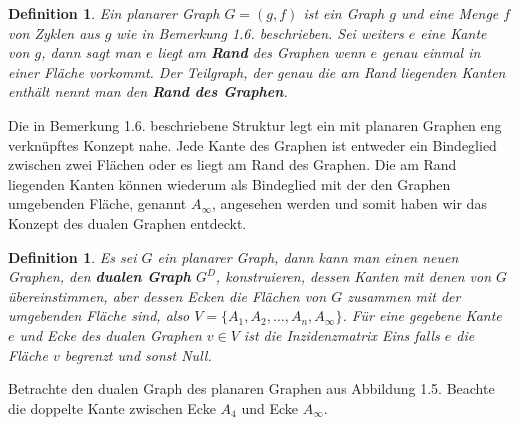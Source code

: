 \documentclass[11pt,a4paper,leqno]{report}
\newtheorem{definition}[theorem]{Definition}
\numberwithin{equation}{chapter}
\begin{document}
\begin{definition}
	Ein planarer Graph $G=(g, f)$ ist ein Graph $g$ und eine Menge $f$ von Zyklen aus $g$ wie in Bemerkung 1.6. beschrieben. Sei weiters $e$ eine Kante von $g$, dann sagt man $e$ liegt am \textbf{Rand} des Graphen wenn $e$ genau einmal in einer Fl\"ache vorkommt. Der Teilgraph, der genau die am Rand liegenden Kanten enth\"alt nennt man den \textbf{Rand des Graphen}.
\end{definition}
\noindent
Die in Bemerkung 1.6. beschriebene Struktur legt ein mit planaren Graphen eng verkn\"upftes Konzept nahe. Jede Kante des Graphen ist entweder ein Bindeglied zwischen zwei Fl\"achen oder es liegt am Rand des Graphen. Die am Rand liegenden Kanten k\"onnen wiederum als Bindeglied mit der den Graphen umgebenden Fl\"ache, genannt $A_{\infty}$, angesehen werden und somit haben wir das Konzept des dualen Graphen entdeckt.
\begin{definition}
	Es sei $G$ ein planarer Graph, dann kann man einen neuen Graphen, den \textbf{dualen Graph} $G^D$, konstruieren, dessen Kanten mit denen von $G$ \"ubereinstimmen, aber dessen Ecken die Fl\"achen von $G$ zusammen mit der umgebenden Fl\"ache sind, also $V=\{A_1, A_2, \dots, A_n, A_\infty \}$. F\"ur eine gegebene Kante $e$ und Ecke des dualen Graphen $v\in V$ ist die Inzidenzmatrix Eins falls $e$ die Fl\"ache $v$ begrenzt und sonst Null.
\end{definition}
\noindent
Betrachte den dualen Graph des planaren Graphen aus Abbildung 1.5. Beachte die doppelte Kante zwischen Ecke $A_4$ und Ecke $A_\infty$. 
\end{document}
